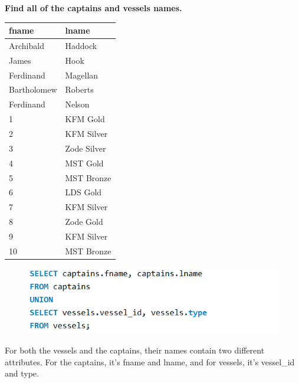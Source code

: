 \documentclass[a4paper]{article}
\begin{document}
\begin{flushleft}
    \textbf{Find all of the captains and vessels names.}
    \begin{table}[!ht]
    \flushleft
    \begin{tabular}{|l|l|}
    \hline
        fname & lname \\ \hline
        Archibald & Haddock \\ \hline
        James & Hook \\ \hline
        Ferdinand & Magellan \\ \hline
        Bartholomew & Roberts \\ \hline
        Ferdinand  & Nelson \\ \hline
        1 & KFM Gold \\ \hline
        2 & KFM Silver \\ \hline
        3 & Zode Silver \\ \hline
        4 & MST Gold \\ \hline
        5 & MST Bronze \\ \hline
        6 & LDS Gold \\ \hline
        7 & KFM Silver \\ \hline
        8 & Zode Gold \\ \hline
        9 & KFM Silver \\ \hline
        10 & MST Bronze \\ \hline
    \end{tabular}
    \end{table}
    \begin{figure} [H]
        \flushleft
        \includegraphics[width=0.7\linewidth]{code/SQLunion.PNG}
        \label{fig:SQLunion}
    \end{figure}
    For both the vessels and the captains, their names contain two different attributes. For the captains, it's fname and lname, and for vessels, it's vessel\_id and type.
\end{flushleft}
\end{document}
